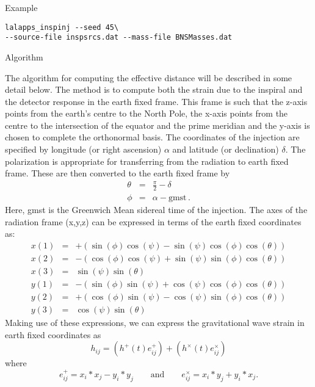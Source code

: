 \begin{entry}
\item[Example]
\begin{verbatim}
lalapps_inspinj --seed 45\
--source-file inspsrcs.dat --mass-file BNSMasses.dat
\end{verbatim}


\item[Algorithm]

The algorithm for computing the effective distance will be described in some
detail below.  The method is to compute both the strain due to the inspiral and
the detector response in the earth fixed frame.  This frame is such that the
z-axis points from the earth's centre to the North Pole, the x-axis points from
the centre to the intersection of the equator and the prime meridian and the
y-axis is chosen to complete the orthonormal basis.  The
coordinates of the injection are specified by longitude (or right ascension)
$\alpha$ and
latitude (or declination) $\delta$.  The polarization is appropriate for transferring
from the radiation to earth fixed frame.  These are then converted to the earth
fixed frame by
%
\begin{eqnarray}
  \theta &=& \frac{\pi}{2} - \delta \\
  \phi &=& \alpha - \textrm{gmst} \, .
\end{eqnarray}
%
Here, gmst is the Greenwich Mean sidereal time of the injection.  The axes of
the radiation frame (x,y,z) can be expressed in terms of the earth fixed
coordinates as:
%
\begin{eqnarray}
  x(1) &=& +( \sin( \phi ) \cos( \psi ) - \sin( \psi ) \cos( \phi ) 
      \cos( \theta ) ) \nonumber \\
  x(2) &=& -( \cos( \phi ) \cos( \psi ) + \sin( \psi ) \sin( \phi ) 
      \cos( \theta ) ) \nonumber \\
  x(3) &=& \sin( \psi ) \sin( \theta ) \label{xrad}\\
  y(1) &=& -( \sin( \phi ) \sin( \psi ) + \cos( \psi ) \cos( \phi ) 
      \cos( \theta ) ) \nonumber\\
  y(2) &=& +( \cos( \phi ) \sin( \psi ) - \cos( \psi ) \sin( \phi ) 
      \cos( \theta ) ) \nonumber \\
  y(3) &=& \cos( \psi ) \sin( \theta ) \label{yrad}
\end{eqnarray}
%
Making use of these expressions, we can express the gravitational wave strain in
earth fixed coordinates as
%
\begin{equation}\label{hij}
  h_{ij} = ( h^{+}(t) e^{+}_{ij} ) + (h^{\times}(t) e^{\times}_{ij})
\end{equation}
%
where
%
\begin{equation}
  e^{+}_{ij} = x_{i} * x_{j} - y_{i} * y_{j} \qquad \mathrm{and} \qquad
  e^{\times}_{ij} = x_{i} * y_{j} + y_{i} * x_{j}.
\end{equation}
%


\end{entry}
